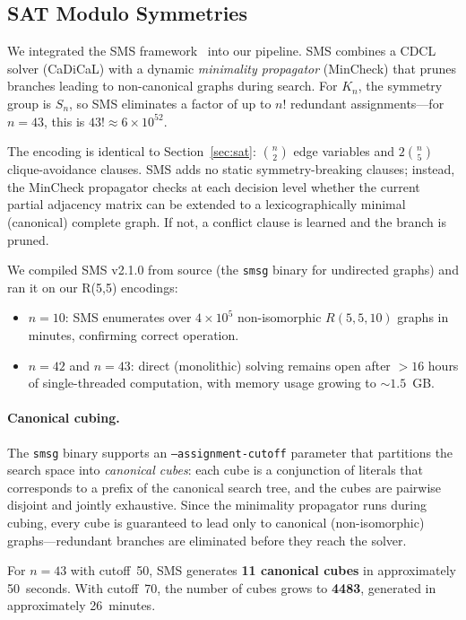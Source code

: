 \documentclass[11pt,a4paper]{article}
\theoremstyle{definition}
\theoremstyle{remark}
\newcommand{\Kn}[1]{K_{#1}}
\newcommand{\Rset}[3]{R(#1,#2,#3)}
\begin{document}
\subsection{SAT Modulo Symmetries}
\label{sec:sms}

We integrated the SMS framework~\cite{KirchwegerSzeider2023} into our
pipeline.  SMS combines a CDCL solver (CaDiCaL) with a dynamic
\emph{minimality propagator} (MinCheck) that prunes branches leading
to non-canonical graphs during search.  For $\Kn{n}$, the symmetry
group is $S_n$, so SMS eliminates a factor of up to $n!$ redundant
assignments---for $n = 43$, this is $43! \approx 6 \times 10^{52}$.

The encoding is identical to Section~\ref{sec:sat}: $\binom{n}{2}$
edge variables and $2\binom{n}{5}$ clique-avoidance clauses.
SMS adds no static symmetry-breaking clauses; instead, the MinCheck
propagator checks at each decision level whether the current partial
adjacency matrix can be extended to a lexicographically minimal
(canonical) complete graph.  If not, a conflict clause is learned
and the branch is pruned.

We compiled SMS v2.1.0 from source (the \texttt{smsg} binary for
undirected graphs) and ran it on our R(5,5) encodings:
\begin{itemize}
  \item $n = 10$: SMS enumerates over $4 \times 10^5$ non-isomorphic
    $\Rset{5}{5}{10}$ graphs in minutes, confirming correct operation.
  \item $n = 42$ and $n = 43$: direct (monolithic) solving remains
    open after $> 16$ hours of single-threaded computation, with
    memory usage growing to $\sim 1.5$~GB.
\end{itemize}

\paragraph{Canonical cubing.}
The \texttt{smsg} binary supports an \texttt{--assignment-cutoff}
parameter that partitions the search space into \emph{canonical cubes}:
each cube is a conjunction of literals that corresponds to a prefix
of the canonical search tree, and the cubes are pairwise disjoint
and jointly exhaustive.  Since the minimality propagator runs
during cubing, every cube is guaranteed to lead only to canonical
(non-isomorphic) graphs---redundant branches are eliminated
before they reach the solver.

For $n = 43$ with cutoff~50, SMS generates \textbf{11 canonical cubes}
in approximately 50~seconds.  With cutoff~70, the number of cubes
grows to \textbf{4483}, generated in approximately 26~minutes.
\end{document}
